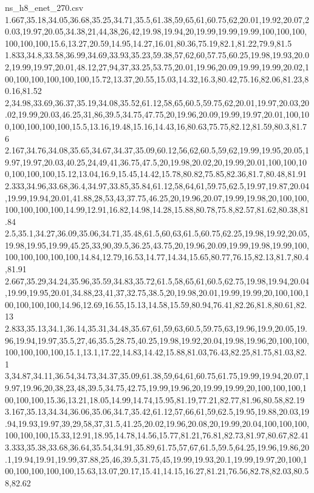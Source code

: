 \begin{filecontents*}[overwrite]{ns_h8_enet_270.csv}
1.667,35.18,34.05,36.68,35.25,34.71,35.5,61.38,59,65,61,60.75,62,20.01,19.92,20.07,20.03,19.97,20.05,34.38,21,44,38,26,42,19.98,19.94,20,19.99,19.99,19.99,100,100,100,100,100,100,15.6,13.27,20.59,14.95,14.27,16.01,80.36,75.19,82.1,81.22,79.9,81.5
1.833,34.8,33.58,36.99,34.69,33.93,35.23,59.38,57,62,60,57.75,60.25,19.98,19.93,20.02,19.99,19.97,20.01,48.12,27,94,37,33.25,53.75,20.01,19.96,20.09,19.99,19.99,20.02,100,100,100,100,100,100,15.72,13.37,20.55,15.03,14.32,16.3,80.42,75.16,82.06,81.23,80.16,81.52
2,34.98,33.69,36.37,35.19,34.08,35.52,61.12,58,65,60.5,59.75,62,20.01,19.97,20.03,20.02,19.99,20.03,46.25,31,86,39.5,34.75,47.75,20,19.96,20.09,19.99,19.97,20.01,100,100,100,100,100,100,15.5,13.16,19.48,15.16,14.43,16,80.63,75.75,82.12,81.59,80.3,81.76
2.167,34.76,34.08,35.65,34.67,34.37,35.09,60.12,56,62,60.5,59,62,19.99,19.95,20.05,19.97,19.97,20.03,40.25,24,49,41,36.75,47.5,20,19.98,20.02,20,19.99,20.01,100,100,100,100,100,100,15.12,13.04,16.9,15.45,14.42,15.78,80.82,75.85,82.36,81.7,80.48,81.91
2.333,34.96,33.68,36.4,34.97,33.85,35.84,61.12,58,64,61,59.75,62.5,19.97,19.87,20.04,19.99,19.94,20.01,41.88,28,53,43,37.75,46.25,20,19.96,20.07,19.99,19.98,20,100,100,100,100,100,100,14.99,12.91,16.82,14.98,14.28,15.88,80.78,75.8,82.57,81.62,80.38,81.84
2.5,35.1,34.27,36.09,35.06,34.71,35.48,61.5,60,63,61.5,60.75,62.25,19.98,19.92,20.05,19.98,19.95,19.99,45.25,33,90,39.5,36.25,43.75,20,19.96,20.09,19.99,19.98,19.99,100,100,100,100,100,100,14.84,12.79,16.53,14.77,14.34,15.65,80.77,76.15,82.13,81.7,80.4,81.91
2.667,35.29,34.24,35.96,35.59,34.83,35.72,61.5,58,65,61,60.5,62.75,19.98,19.94,20.04,19.99,19.95,20.01,34.88,23,41,37,32.75,38.5,20,19.98,20.01,19.99,19.99,20,100,100,100,100,100,100,14.96,12.69,16.55,15.13,14.58,15.59,80.94,76.41,82.26,81.8,80.61,82.13
2.833,35.13,34.1,36.14,35.31,34.48,35.67,61,59,63,60.5,59.75,63,19.96,19.9,20.05,19.96,19.94,19.97,35.5,27,46,35.5,28.75,40.25,19.98,19.92,20.04,19.98,19.96,20,100,100,100,100,100,100,15.1,13.1,17.22,14.83,14.42,15.88,81.03,76.43,82.25,81.75,81.03,82.1
3,34.87,34.11,36.54,34.73,34.37,35.09,61.38,59,64,61,60.75,61.75,19.99,19.94,20.07,19.97,19.96,20,38,23,48,39.5,34.75,42.75,19.99,19.96,20,19.99,19.99,20,100,100,100,100,100,100,15.36,13.21,18.05,14.99,14.74,15.95,81.19,77.21,82.77,81.96,80.58,82.19
3.167,35.13,34.34,36.06,35.06,34.7,35.42,61.12,57,66,61,59,62.5,19.95,19.88,20.03,19.94,19.93,19.97,39,29,58,37,31.5,41.25,20.02,19.96,20.08,20,19.99,20.04,100,100,100,100,100,100,15.33,12.91,18.95,14.78,14.56,15.77,81.21,76.81,82.73,81.97,80.67,82.41
3.333,35.38,33.68,36.64,35.54,34.91,35.89,61.75,57,67,61.5,59.5,64.25,19.96,19.86,20.1,19.94,19.91,19.99,37.88,25,46,39.5,31.75,45,19.99,19.93,20.1,19.99,19.97,20,100,100,100,100,100,100,15.63,13.07,20.17,15.41,14.15,16.27,81.21,76.56,82.78,82.03,80.58,82.62

\end{filecontents*}
